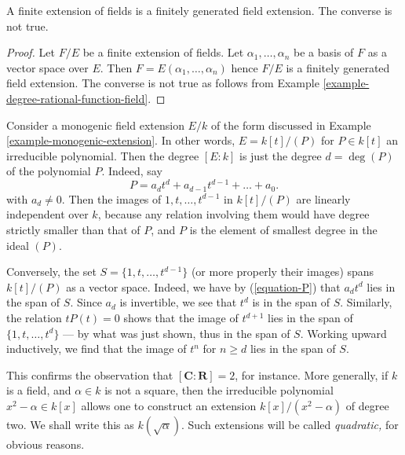 \begin{lemma}
\label{lemma-finite-finitely-generated}
A finite extension of fields is a finitely generated field extension.
The converse is not true.
\end{lemma}

\begin{proof}
Let $F/E$ be a finite extension of fields. Let $\alpha_1, \ldots, \alpha_n$
be a basis of $F$ as a vector space over $E$. Then
$F = E(\alpha_1, \ldots, \alpha_n)$ hence $F/E$ is a finitely generated
field extension. The converse is not true as follows from
Example \ref{example-degree-rational-function-field}.
\end{proof}

\begin{example}
\label{example-degree-simple-algebraic-extension}
Consider a monogenic field extension $E/k$ of the form discussed in
Example \ref{example-monogenic-extension}.
In other words, $E = k[t]/(P)$ for $P \in k[t]$ an irreducible polynomial.
Then the degree $[E : k]$ is just the degree $d = \deg(P)$ of the
polynomial $P$. Indeed, say
\begin{equation}
\label{equation-P}
P = a_d t^d + a_{d - 1} t^{d - 1} + \ldots + a_0.
\end{equation}
with $a_d \not = 0$. Then the images of $1, t, \ldots, t^{d - 1}$ in
$k[t]/(P)$ are linearly independent over $k$, because any relation involving
them would have degree strictly smaller than that of $P$, and $P$ is the
element of smallest degree in the ideal $(P)$.

\medskip\noindent
Conversely, the set $S = \{1, t, \ldots, t^{d - 1}\}$ (or more
properly their images) spans $k[t]/(P)$ as a vector space.
Indeed, we have by (\ref{equation-P}) that $a_d t^d$ lies in the span of $S$.
Since $a_d$ is invertible, we see that $t^d$ is in the span of $S$.
Similarly, the relation $t P(t) = 0$ shows that the image of $t^{d + 1}$
lies in the span of $\{1, t, \ldots, t^d\}$ --- by what was just shown, thus
in the span of $S$. Working upward inductively, we find
that the image of $t^n$ for $n \geq d$ lies in the span of $S$.
\end{example}

\noindent
This confirms the observation that $[\mathbf{C}: \mathbf{R}] = 2$, for
instance. More generally, if $k$ is a field, and $\alpha \in k$ is not a
square, then the irreducible polynomial $x^2 - \alpha \in k[x]$ allows one
to construct an extension $k[x]/(x^2 - \alpha)$ of degree two.
We shall write this as $k(\sqrt{\alpha})$. Such extensions will be called
{\it quadratic,} for obvious reasons.

